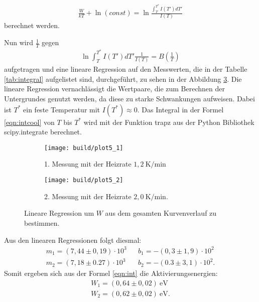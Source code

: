 \begin{align}
  \frac{W}{kT}+\ln{(const)}=\ln \frac{\int_T^{T^*}{I(T')dT'}}{I(T)} \label{eqn:int}
\end{align}
berechnet werden.

Nun wird $\frac{1}{T}$ gegen
\begin{align}
  \ln \int_T^{T^*}I(T')dT'\frac{1}{I(T)}=B(\frac{1}{T}) \label{eqn:intcool}
\end{align}
aufgetragen und eine
lineare Regression auf den Messwerten,
die in der Tabelle \ref{tab:integral} aufgelistet sind,
durchgeführt,
zu sehen in der Abbildung \ref{fig:intreg}.
Die lineare Regression vernachlässigt die Wertpaare,
die zum Berechnen der Untergrundes genutzt werden,
da diese zu starke Schwankungen aufweisen.
Dabei ist $T^*$ ein feste Temperatur mit $I(T^*)\approx 0$.
Das Integral in der Formel \ref{eqn:intcool} von $T$ bis $T^*$
wird mit der Funktion trapz aus der Python Bibliothek scipy.integrate
berechnet.





\begin{figure}
  \centering
  \begin{subfigure}{0.49\textwidth}
    \centering
    \texttt{[image: build/plot5\_1]}
    \caption{1. Messung mit der Heizrate $1,2 \ \si{\kelvin\per\minute}$}
    \label{fig:intreg1}
  \end{subfigure}
  \begin{subfigure}{0.49\textwidth}
    \centering
    \texttt{[image: build/plot5\_2]}
    \caption{2. Messung mit der Heizrate $2,0 \ \si{\kelvin\per\minute}$.}
    \label{fig:intreg2}
  \end{subfigure}
\caption{Lineare Regression um $W$ aus dem gesamten Kurvenverlauf zu bestimmen.}
\label{fig:intreg}
\end{figure}
\FloatBarrier
Aus den linearen Regressionen folgt diesmal:
\begin{align*}
  m_1=(7,44\pm0,19)\cdot10^{3}    &  &b_1=-(0,3\pm1,9)\cdot10^{2}\\
  m_2=(7,18\pm0.27)\cdot10^{3}    &  &b_2=-(0.3\pm3,1)\cdot10^{2}.
\end{align*}
Somit ergeben sich aus der Formel \eqref{eqn:int} die Aktivierungsenergien:
\begin{align*}
  W_1=(0,64\pm0,02)\ \si{\electronvolt}\\
  W_2=(0,62\pm0,02)\ \si{\electronvolt}.
\end{align*}


